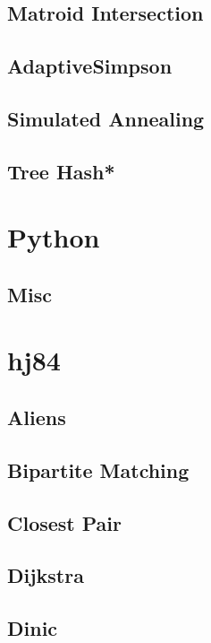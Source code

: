 \subsection{Matroid Intersection}

\subsection{AdaptiveSimpson}

\subsection{Simulated Annealing}

\subsection{Tree Hash*} %

\section{Python}
\subsection{Misc}

\section{hj84}
\subsection{Aliens} %

\subsection{Bipartite Matching}

\subsection{Closest Pair}

\subsection{Dijkstra}

\subsection{Dinic}

